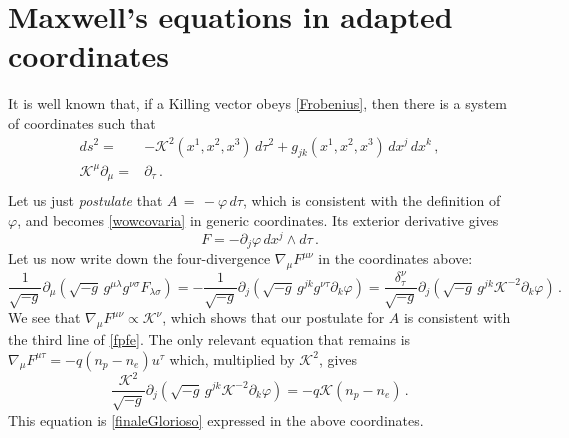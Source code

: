 \documentclass[a4paper, amsfonts, amssymb, amsmath, reprint, showkeys, nofootinbib, twoside, onecolumn,notitlepage]{revtex4-1}
\newcommand{\K}{{\mathcal{K}}}
\theoremstyle{definition}
\theoremstyle{theorem}
\begin{document}
\section{Maxwell's equations in adapted coordinates}\label{appendiceDura}

It is well known \cite[\S 6.1]{Wald} that, if a Killing vector obeys \eqref{Frobenius}, then there is a system of coordinates such that
\begin{equation}
\begin{split}
ds^2 ={}& -\K^2(x^1,x^2,x^3) \, d\tau^2 +g_{jk}(x^1,x^2,x^3) \, dx^j \, dx^k \, , \\
\K^\mu \partial_\mu ={}& \partial_\tau \, .\\
\end{split}
\end{equation}
Let us just \textit{postulate} that $A\,{=}\,{-}\varphi \, d\tau$, which is consistent with the definition of $\varphi$, and becomes \eqref{wowcovaria} in generic coordinates. Its exterior derivative gives
\begin{equation}
F = -\partial_j \varphi \, dx^j \wedge d\tau \, .
\end{equation}
Let us now write down the four-divergence
$\nabla_\mu F^{\mu \nu}$ in the coordinates above:
\begin{equation}
\dfrac{1}{\sqrt{-g}} \partial_\mu (\sqrt{-g} \, g^{\mu \lambda} g^{\nu \sigma}F_{\lambda \sigma})=-\dfrac{1}{\sqrt{-g}} \partial_j (\sqrt{-g} \, g^{j k} g^{\nu \tau}\partial_k \varphi)=\dfrac{\delta^\nu_\tau}{\sqrt{-g}} \partial_j (\sqrt{-g} \, g^{j k} \K^{-2}\partial_k \varphi) \, .
\end{equation}
We see that $\nabla_\mu F^{\mu \nu}\propto \K^\nu$, which shows that our postulate for $A$ is consistent with the third line of \eqref{fpfe}. The only relevant equation that remains is $\nabla_\mu F^{\mu \tau}=-q(n_p-n_e)u^\tau$ which, multiplied by $\K^2$, gives
\begin{equation}
\dfrac{\K^2}{\sqrt{-g}} \partial_j (\sqrt{-g} \, g^{j k} \K^{-2} \partial_k \varphi)= -q\K (n_p{-}n_e) \, . 
\end{equation}
This equation is \eqref{finaleGlorioso} expressed in the above coordinates.






\label{lastpage}
\end{document}
